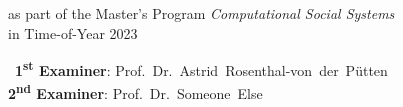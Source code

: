 \begin{titlepage}
\begin{center}
    {\large as part of the Master's Program \textit{Computational Social Systems}}\\[2.3ex]    
    {\large in Time-of-Year 2023}

    \vfill

    \parbox{10cm}{%
      ~\textbf{1\textsuperscript{st} Examiner}: Prof.~Dr.~Astrid~Rosenthal-von~der~P{\"u}tten\\
      \textbf{2\textsuperscript{nd} Examiner}: Prof.~Dr.~Someone~Else\\
    }
    
  \end{center}
\end{titlepage}
